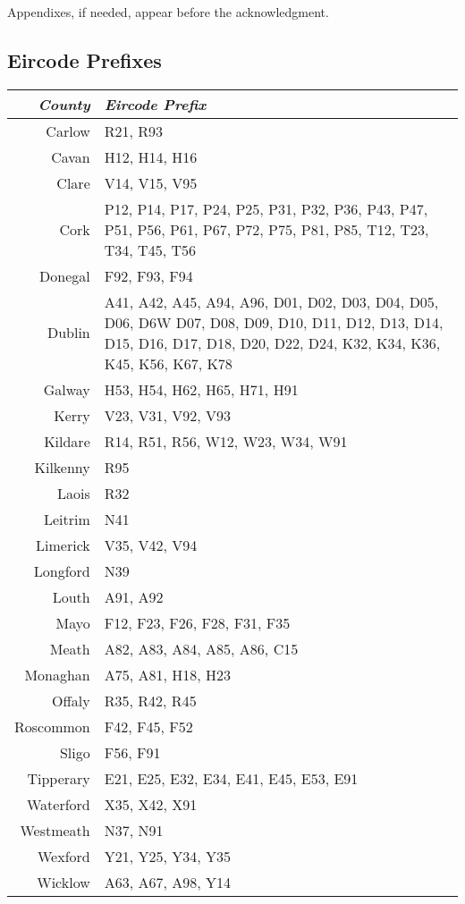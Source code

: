 \documentclass[twocolumn]{article}
\begin{document}
Appendixes, if needed, appear before the acknowledgment.



\raggedright

\begin{appendices}
\section{Eircode Prefixes\label{a:eircode}}
\begin{tabularx}{0.5\textwidth}{r X}
    \textit{County} & \textit{Eircode Prefix} \\ \hline
    Carlow & R21, R93 \\ \hline
    Cavan & H12, H14, H16 \\ \hline
    Clare & V14, V15, V95 \\ \hline
    Cork & P12, P14, P17, P24, P25, P31, P32, P36, P43, P47, P51, P56, P61, P67, P72, P75, P81, P85, T12, T23, T34, T45, T56 \\ \hline
    Donegal & F92, F93, F94 \\ \hline
    Dublin & A41, A42, A45, A94, A96, D01, D02, D03, D04, D05, D06, D6W D07, D08, D09, D10, D11, D12, D13, D14, D15, D16, D17, D18, D20, D22, D24, K32, K34, K36, K45, K56, K67, K78 \\ \hline
    Galway & H53, H54, H62, H65, H71, H91 \\ \hline
    Kerry & V23, V31, V92, V93 \\ \hline
    Kildare & R14, R51, R56, W12, W23, W34, W91 \\ \hline
    Kilkenny & R95 \\ \hline
    Laois & R32 \\ \hline
    Leitrim & N41 \\ \hline
    Limerick & V35, V42, V94 \\ \hline
    Longford & N39 \\ \hline
    Louth & A91, A92 \\ \hline
    Mayo & F12, F23, F26, F28, F31, F35 \\ \hline
    Meath & A82, A83, A84, A85, A86, C15 \\ \hline
    Monaghan & A75, A81, H18, H23 \\ \hline
    Offaly & R35, R42, R45 \\ \hline
    Roscommon & F42, F45, F52 \\ \hline
    Sligo & F56, F91 \\ \hline
    Tipperary & E21, E25, E32, E34, E41, E45, E53, E91 \\ \hline
    Waterford & X35, X42, X91 \\ \hline
    Westmeath & N37, N91 \\ \hline
    Wexford & Y21, Y25, Y34, Y35 \\ \hline
    Wicklow & A63, A67, A98, Y14
\end{tabularx}

\end{appendices}
\end{document}
